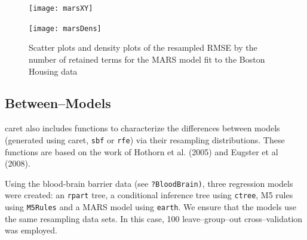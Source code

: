 \documentclass[12pt]{article}
\newcommand{\code}[1]{\mbox{\footnotesize\color{darkblue}\texttt{#1}}}
\newcommand{\pkg}[1]{{\fontseries{b}\selectfont #1}}
\renewcommand{\pkg}[1]{{\textsf{#1}}}
\begin{document}
\begin{figure}[hb]
   \begin{center}      
      \texttt{[image: marsXY]}   
      
      \vspace{.3 in}      

       \texttt{[image: marsDens]}   
      \caption{Scatter plots and density plots of the resampled RMSE by the number of
        retained terms for the MARS model fit to the Boston Housing data}
      \label{f:marsDesns}       
   \end{center}
\end{figure}  
\clearpage

\subsection{Between--Models}\label{S:betweenMod}


\pkg{caret} also includes functions to characterize the differences
between models (generated using \pkg{caret}, \code{sbf} or
\code{rfe}) via their resampling distributions. These functions are
based on the work of Hothorn et al. (2005) and Eugster et al (2008).

Using the blood-brain barrier data (see \code{?BloodBrain)}, three regression models were
created: an \code{rpart} tree, a conditional inference tree using
\code{ctree}, M5 rules using \code{M5Rules} and a MARS model using
\code{earth}. We ensure that the models use the same resampling data
sets. In this case, 100 leave--group--out cross--validation was
employed. 
\end{document}
